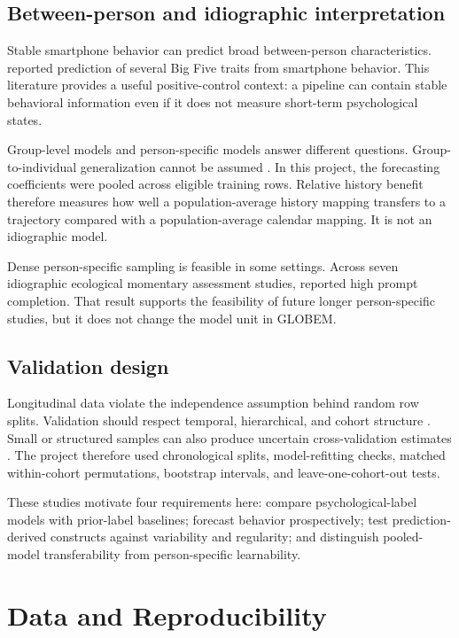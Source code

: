 \documentclass[a4paper,11pt,oneside]{report}
\begin{document}
\section{Between-person and idiographic interpretation}

Stable smartphone behavior can predict broad between-person characteristics.
\citet{stachl2020personality} reported prediction of several Big Five traits from
smartphone behavior. This literature provides a useful positive-control context: a
pipeline can contain stable behavioral information even if it does not measure
short-term psychological states.

Group-level models and person-specific models answer different questions.
Group-to-individual generalization cannot be assumed \citep{fisher2018group}. In
this project, the forecasting coefficients were pooled across eligible training
rows. Relative history benefit therefore measures how well a population-average
history mapping transfers to a trajectory compared with a population-average
calendar mapping. It is not an idiographic model.

Dense person-specific sampling is feasible in some settings. Across seven
idiographic ecological momentary assessment studies, \citet{soyster2019feasibility}
reported high prompt completion. That result supports the feasibility of future
longer person-specific studies, but it does not change the model unit in GLOBEM.

\section{Validation design}

Longitudinal data violate the independence assumption behind random row splits.
Validation should respect temporal, hierarchical, and cohort structure
\citep{roberts2017crossvalidation}. Small or structured samples can also produce
uncertain cross-validation estimates \citep{varoquaux2018crossvalidation}. The
project therefore used chronological splits, model-refitting checks, matched
within-cohort permutations, bootstrap intervals, and leave-one-cohort-out tests.

These studies motivate four requirements here: compare psychological-label models
with prior-label baselines; forecast behavior prospectively; test prediction-derived
constructs against variability and regularity; and distinguish pooled-model
transferability from person-specific learnability.

\chapter{Data and Reproducibility}
\label{ch:data}
\end{document}
